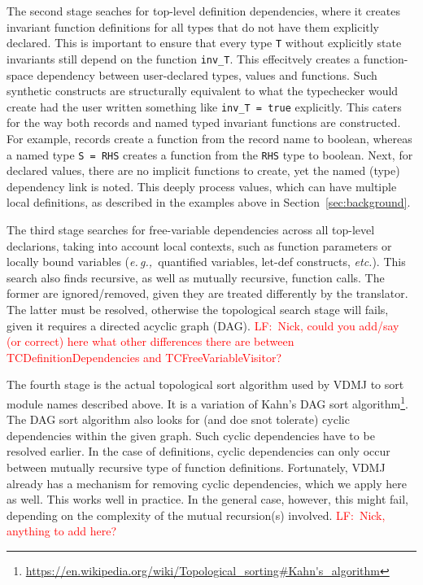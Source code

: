 \documentclass[runningheads,a4paper]{llncs}
\newcommand{\eg}{{\em e.\,g.,\/}}
\newcommand{\etc}{{\em etc.\/}}
\newcommand{\lfcomment}[1]{{\scriptsize\textcolor{red}{LF:~#1}}}
\begin{document}
The second stage seaches for top-level definition dependencies, where it creates invariant function definitions for all types that do not have them explicitly declared. This is important to ensure that every type \verb'T' without explicitly state invariants still depend on the function \verb'inv_T'. This effecitvely creates a function-space dependency between user-declared types, values and functions. Such synthetic constructs are structurally equivalent to what the typechecker would create had the user written something like \verb'inv_T = true' explicitly. This caters for the way both records and named typed invariant functions are constructed. For example, records create a function from the record name to boolean, whereas a named type \verb'S = RHS' creates a function from the \verb'RHS' type to boolean. Next, for declared values, there are no implicit functions to create, yet the named (type) dependency link is noted. This deeply process values, which can have multiple local definitions, as described in the examples above in Section~\ref{sec:background}.    

The third stage searches for free-variable dependencies across all top-level declarions, taking into account local contexts, such as function parameters or locally bound variables (\eg~quantified variables, let-def constructs, \etc). This search also finds recursive, as well as mutually recursive, function calls. The former are ignored/removed, given they are treated differently by the translator. The latter must be resolved, otherwise the topological search stage will fails, given it requires a directed acyclic graph (DAG). \lfcomment{Nick, could you add/say (or correct) here what other differences there are between TCDefinitionDependencies and TCFreeVariableVisitor?}    

The fourth stage is the actual topological sort algorithm used by VDMJ to sort module names described above. It is a variation of Kahn's DAG sort algorithm\footnote{\url{https://en.wikipedia.org/wiki/Topological_sorting\#Kahn's_algorithm}}. The DAG sort algorithm also looks for (and doe snot tolerate) cyclic dependencies within the given graph. Such cyclic dependencies have to be resolved earlier. In the case of definitions, cyclic dependencies can only occur between mutually recursive type of function definitions. Fortunately, VDMJ already has a mechanism for removing cyclic dependencies, which we apply here as well. This works well in practice. In the general case, however, this might fail, depending on the complexity of the mutual recursion(s) involved. \lfcomment{Nick, anything to add here?}
\end{document}
